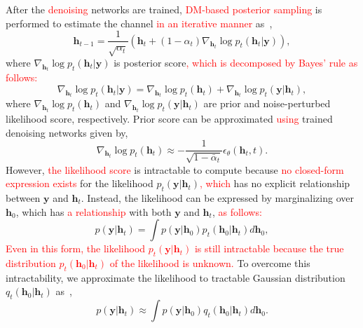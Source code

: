 \documentclass[lettersize,journal]{IEEEtran}
\newcommand{\tred}{\textcolor{red}}
\begin{document}
After the \tred{denoising} networks are trained, \tred{DM-based posterior sampling} is performed to estimate the channel \tred{in an iterative manner} as~\cite{zhouGenerativeDiffusionModels2025},
\begin{equation}
\mathbf{h}_{t-1} = \frac{1}{\sqrt{ \alpha_{t} }}(\mathbf{h}_{t}+(1-\alpha_{t})\nabla_{\mathbf{h}_{t}}\log p_{t}(\mathbf{h}_{t}|\mathbf{y})),
\end{equation}
where $\nabla_{\mathbf{h}_{t}}\log p_{t}(\mathbf{h}_{t}|\mathbf{y})$ is posterior score\tred{, which is decomposed by Bayes' rule as follows:}
\begin{equation}
\nabla_{\mathbf{h}_{t}}\log p_{t}(\mathbf{h}_{t}|\mathbf{y}) = \nabla_{\mathbf{h}_{t}}\log p_{t}(\mathbf{h}_{t})+\nabla_{\mathbf{h}_{t}}\log p_{t}(\mathbf{y}|\mathbf{h}_{t}),
\end{equation}
where $\nabla_{\mathbf{h}_{t}}\log p_{t}(\mathbf{h}_{t})$ and $\nabla_{\mathbf{h}_{t}}\log p_{t}(\mathbf{y}|\mathbf{h}_{t})$ are prior and noise-perturbed likelihood score, respectively.
Prior score can be approximated \tred{using} trained denoising networks given by,
\begin{equation}
\nabla_{\mathbf{h}_{t}}\log p_{t}(\mathbf{h}_{t})\approx -\frac{1}{\sqrt{ 1-\bar{\alpha}_{t} }}\epsilon_{\theta}(\mathbf{h}_{t},t).
\end{equation}
However, \tred{the likelihood score} is intractable to compute because \tred{no closed-form expression exists} for the likelihood $p_{t}(\mathbf{y}|\mathbf{h}_{t})$\tred{, which} has no explicit relationship between $\mathbf{y}$ and $\mathbf{h}_{t}$. Instead, the likelihood can be expressed by marginalizing over $\mathbf{h}_{0}$, which has \tred{a relationship} with both $\mathbf{y}$ and $\mathbf{h}_{t}$, \tred{as follows:}
\begin{equation}
p(\mathbf{y}|\mathbf{h}_{t}) = \int p(\mathbf{y}|\mathbf{h}_{0})p_{t}(\mathbf{h}_{0}|\mathbf{h}_{t})d\mathbf{h}_{0},
\end{equation}
\tred{Even in this form, the likelihood $p_{t}(\mathbf{y}|\mathbf{h}_{t})$ is still intractable because the true distribution $p_{t}(\mathbf{h}_{0}|\mathbf{h}_{t})$ of the likelihood is unknown.} To overcome this intractability, we approximate the likelihood to tractable Gaussian distribution $q_{t}(\mathbf{h}_{0}|\mathbf{h}_{t})$ as~\cite{arvinteMIMOChannelEstimation2023,zhouGenerativeDiffusionModels2025},
\begin{equation}
p(\mathbf{y}|\mathbf{h}_{t}) \approx \int p(\mathbf{y}|\mathbf{h}_{0})q_{t}(\mathbf{h}_{0}|\mathbf{h}_{t})d\mathbf{h}_{0}.
\end{equation}
\end{document}
